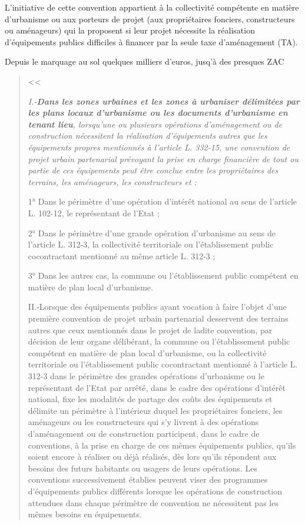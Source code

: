 	L’initiative de cette convention appartient à la collectivité compétente en matière d’urbanisme ou aux porteurs de projet (aux propriétaires fonciers, constructeurs ou aménageurs) qui la proposent si leur projet nécessite la réalisation d’équipements publics difficiles à financer par la seule taxe d’aménagement (TA).
	
	Depuis le marquage au sol quelques milliers d'euros, jusq'à des presques ZAC
	
	\begin{quote}
		\textbf{}
		
		<< {\itshape I.-\textbf{Dans les zones urbaines et les zones à urbaniser délimitées par les plans locaux d'urbanisme ou les documents d'urbanisme en tenant lieu}, lorsqu'une ou plusieurs opérations d'aménagement ou de construction nécessitent la réalisation d'équipements autres que les équipements propres mentionnés à l'article L. 332-15, une convention de projet urbain partenarial prévoyant la prise en charge financière de tout ou partie de ces équipements peut être conclue entre les propriétaires des terrains, les aménageurs, les constructeurs et :
			
		1° Dans le périmètre d'une opération d'intérêt national au sens de l'article L. 102-12, le représentant de l'Etat ;
		
		2° Dans le périmètre d'une grande opération d'urbanisme au sens de l'article L. 312-3, la collectivité territoriale ou l'établissement public cocontractant mentionné au même article L. 312-3 ;
		
		3° Dans les autres cas, la commune ou l'établissement public compétent en matière de plan local d'urbanisme.
		
		II.-Lorsque des équipements publics ayant vocation à faire l'objet d'une première convention de projet urbain partenarial desservent des terrains autres que ceux mentionnés dans le projet de ladite convention, par décision de leur organe délibérant, la commune ou l'établissement public compétent en matière de plan local d'urbanisme, ou la collectivité territoriale ou l'établissement public cocontractant mentionné à l'article L. 312-3 dans le périmètre des grandes opérations d'urbanisme ou le représentant de l'Etat par arrêté, dans le cadre des opérations d'intérêt national, fixe les modalités de partage des coûts des équipements et délimite un périmètre à l'intérieur duquel les propriétaires fonciers, les aménageurs ou les constructeurs qui s'y livrent à des opérations d'aménagement ou de construction participent, dans le cadre de conventions, à la prise en charge de ces mêmes équipements publics, qu'ils soient encore à réaliser ou déjà réalisés, dès lors qu'ils répondent aux besoins des futurs habitants ou usagers de leurs opérations. Les conventions successivement établies peuvent viser des programmes d'équipements publics différents lorsque les opérations de construction attendues dans chaque périmètre de convention ne nécessitent pas les mêmes besoins en équipements.
		
}
\end{quote}

